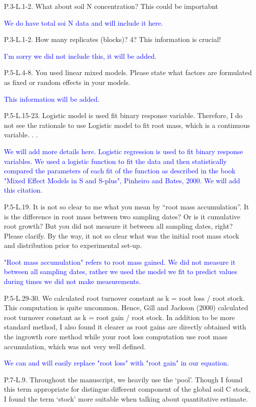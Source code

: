 \documentclass[]{article}
\begin{document}
P.3-L.1-2. What about soil N concentration? This could be importabnt

\textcolor{blue}{We do have total soi N data and will include it here.}

P.3-L.1-2. How many replicates (blocks)? 4? This information is crucial!

\textcolor{blue}{I'm sorry we did not include this, it will be added.}

P.5-L.4-8. You used linear mixed models. Please state what factors are
formulated as fixed or random effects in your models.

\textcolor{blue}{This information will be added.}

P.5-L.15-23. Logistic model is used fit binary response variable.
Therefore, I do not see the rationale to use Logistic model to fit root
mass, which is a continuous variable. . .

\textcolor{blue}{We will add more details here. Logistic regression is used to fit binary response variables. We used a logistic function to fit the data and then statistically compared the parameters of each fit of the function as described in the book "Mixed Effect Models in S and S-plus", Pinheiro and Bates, 2000. We will add this citation.}

P.5-L.19. It is not so clear to me what you mean by ``root mass
accumulation''. It is the difference in root mass between two sampling
dates? Or is it cumulative root growth? But you did not measure it
between all sampling dates, right? Please clarify. By the way, it not so
clear what was the initial root mass stock and distribution prior to
experimental set-up.

\textcolor{blue}{"Root mass accumulation" refers to root mass gained. We did not measure it between all sampling dates, rather we used the model we fit to predict values during times we did not make measurements.}

P.5-L.29-30. We calculated root turnover constant as k = root loss /
root stock. This computation is quite uncommon. Hence, Gill and Jackson
(2000) calculated root turnover constant as k = root gain / root stock.
In addition to be more standard method, I also found it clearer as root
gains are directly obtained with the ingrowth core method while your
root loss computation use root mass accumulation, which was not very
well defined.

\textcolor{blue}{We can and will easily replace "root loss" with "root gain" in our equation.}

P.7-L.9. Throughout the manuscript, we heavily use the `pool'. Though I
found this term appropriate for distingue different component of the
global soil C stock, I found the term `stock' more suitable when talking
about quantitative estimate.
\end{document}
